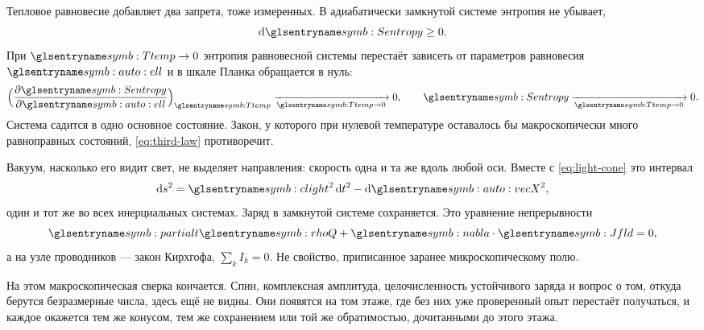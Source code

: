 Тепловое равновесие добавляет два запрета, тоже измеренных.
В адиабатически замкнутой системе энтропия не убывает,
\begin{equation}
  \mathrm{d}\entropyS \ge 0.
  \label{eq:second-law}
\end{equation}
При $\tempT\to 0$ энтропия равновесной системы перестаёт зависеть от параметров равновесия~$\symEll$
и в шкале Планка обращается в нуль:
\begin{equation}
  \Bigl(\frac{\partial \entropyS}{\partial \symEll}\Bigr)_{\tempT}
    \xrightarrow[\tempT\to 0]{} 0,
  \qquad
  \entropyS \xrightarrow[\tempT\to 0]{} 0.
  \label{eq:third-law}
\end{equation}
Система садится в одно основное состояние.
Закон, у которого при нулевой температуре оставалось бы макроскопически много
равноправных состояний, \eqref{eq:third-law} противоречит.

Вакуум, насколько его видит свет, не выделяет направления:
скорость одна и та же вдоль любой оси.
Вместе с \eqref{eq:light-cone} это интервал
\begin{equation}
  \mathrm{d}s^2 = \speedC^2\,\mathrm{d}t^2 - \mathrm{d}\vecX^2,
  \label{eq:interval}
\end{equation}
один и тот же во всех инерциальных системах.
Заряд в замкнутой системе сохраняется.
Это уравнение непрерывности
\begin{equation}
  \opPartialT\chargeRho + \opNabla\cdot\fieldJ = 0,
  \label{eq:continuity}
\end{equation}
а на узле проводников --- закон Кирхгофа, $\sum_k I_k = 0$.
Не свойство, приписанное заранее микроскопическому полю.

На этом макроскопическая сверка кончается.
Спин, комплексная амплитуда, целочисленность устойчивого заряда
и вопрос о том, откуда берутся безразмерные числа, здесь ещё не видны.
Они появятся на том этаже, где без них уже проверенный опыт перестаёт получаться,
и каждое окажется тем же конусом, тем же сохранением или той же обратимостью, дочитанными до этого этажа.


